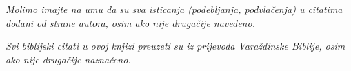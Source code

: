 \thispagestyle{empty}

\vspace*{1cm}

\begin{center}
    \textit{Molimo imajte na umu da su sva isticanja (podebljanja, podvlačenja) u citatima dodani od strane autora, osim ako nije drugačije navedeno.}
    
    \textit{Svi biblijski citati u ovoj knjizi preuzeti su iz prijevoda Varaždinske Biblije, osim ako nije drugačije naznačeno.}
\end{center}

\cleardoublepage